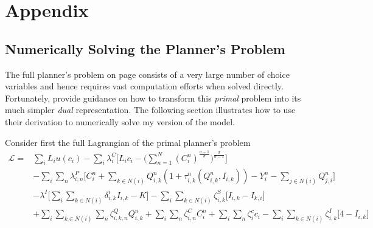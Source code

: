 \documentclass[11pt, oneside]{article}   	%
\begin{document}
  \section*{Appendix}
\begin{spacing}{1.3}
  \subsection{Numerically Solving the Planner's Problem}
  \label{chapter:APP:math}


The full planner's problem on page \pageref{planner_problem} consists of a very large number of choice variables and hence requires vast computation efforts when solved directly. Fortunately, \cite{Fajgelbaum_OptimalTransportNetworks_2017} provide guidance on how to transform this \emph{primal} problem into its much simpler \emph{dual} representation. The following section illustrates how to use their derivation to numerically solve my version of the model.

Consider first the full Lagrangian of the primal planner's problem
\begin{equation}
  \begin{aligned}
    \mathcal{L} ={} & \sum_{i}^{} L_{i}u(c_{i}) - \sum_{i}^{}\lambda^{C}_{i}\bigg[L_{i}c_{i} - \bigg( \sum_{n=1}^{N} (C_{i}^{n})^{\frac{\sigma-1}{\sigma}}\bigg)^{\frac{\sigma}{\sigma-1}} \bigg] \\
  & - \sum_{i}^{}\sum_{n}^{}\lambda^{P}_{i,n}\bigg[ C_{i}^{n} + \sum_{k\in N(i)}^{}Q_{i,k}^{n}(1+\tau_{i,k}^{n}(Q_{i,k}^{n}, I_{i,k})) - Y_{i}^{n} - \sum_{j\in N(i)}^{}Q_{j,i}^{n} \bigg] \\
  & - \lambda^{I}\bigg[\sum_{i}^{}\sum_{k\in N(i)}^{}\delta^{i}_{i,k}I_{i,k} - K \bigg] - \sum_{i}^{}\sum_{k \in N(i)}^{}\zeta^{S}_{i,k}\bigg[ I_{i,k} - I_{k,i} \bigg] \\
  & + \sum_{i}^{}\sum_{k \in N(i)}^{}\sum_{n}^{} \zeta^{Q}_{i,k,n}Q_{i,k}^{n} + \sum_{i}^{}\sum_{n}^{} \zeta^{C}_{i,n}C_{i}^{n} + \sum_{i}^{}\sum_{n}^{} \zeta^{c}_{i}c_{i} - \sum_{i}^{}\sum_{k \in N(i)}^{} \zeta^{I}_{i,k}\bigg[4-I_{i,k}\bigg]
  \end{aligned}
\end{equation}


\end{spacing}
\end{document}

